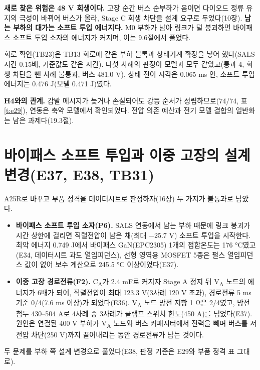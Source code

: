 \textbf{새로 찾은 위험은 48 V 회생이다.} 고장 순간 버스 순부하가 음이면 다이오드 정류 유지의 극성이 바뀌어 버스가 올라, Stage C 회생 차단을 설계 요구로 두었다(10장). \textbf{남는 부하의 대가는 소프트 투입 에너지다.} M0 부하가 남아 링크가 덜 붕괴하면 바이패스 소프트 투입 소자의 에너지가 커지며, 이는 9.6절에서 풀었다.

회로 확인(TB23)은 TB13 회로에 같은 부하 블록과 상태기계 확장을 넣어 했다(SALS 시간 0.15배, 기준값도 같은 시간). 다섯 사례의 판정이 모델과 모두 같았고(통과 4, 회생 차단을 뺀 사례 불통과, 버스 481.0 V), 상태 전이 시각은 0.065 ms 안, 소프트 투입 에너지는 0.476 J(모델 0.471 J)였다.

\textbf{H4와의 관계.} 감발 메시지가 늦거나 손실되어도 강등 순서가 성립하므로(74/74, 표 \ref{t:e29}), 연동은 축약 모델에서 확인되었다. 전압 의존 예산과 전기 모델 결합의 일반화는 남은 과제다(19.3절).

\section{바이패스 소프트 투입과 이중 고장의 설계 변경(E37, E38, TB31)}

A25R로 바꾸고 부품 정격을 데이터시트로 판정하자(16장) 두 가지가 불통과로 남았다.

\begin{itemize}
\item \textbf{바이패스 소프트 투입 소자(P6).} SALS 연동에서 남는 부하 때문에 링크 붕괴가 시간 상한에 걸리면 직렬전압이 남은 채(최대 −25.7 V) 소프트 투입을 시작한다. 최악 에너지 0.749 J에서 바이패스 GaN(EPC2305) 1개의 접합온도는 176 °C였고(E34, 데이터시트 과도 열임피던스), 선형 영역용 MOSFET 5종은 펄스 열임피던스 값이 없어 보수 계산으로 245.5 °C 이상이었다(E37).
\item \textbf{이중 고장 경로전류(F2).} C\textsubscript{A}가 2.4 mF로 커지자 Stage A 정지 뒤 V\textsubscript{A} 노드의 에너지가 6배가 되어, 직렬전압이 최대 123.3 V(3사례 120 V 초과), 경로전류 5 ms 기준 0/4(7.6 ms 이상)가 되었다(E36). V\textsubscript{A} 노드 방전 저항 1 Ω은 2/4였고, 방전 첨두 430–504 A로 4사례 중 3사례가 클램프 스위치 한도(450 A)를 넘었다(E37). 원인은 연결된 400 V 부하가 V\textsubscript{A} 노드와 버스 커패시터에서 전력을 빼며 버스를 저전압 차단(250 V)까지 끌어내리는 동안 경로전류가 남는 것이다.
\end{itemize}

두 문제를 부하 쪽 설계 변경으로 풀었다(E38, 판정 기준은 E29와 부품 정격 표 그대로).

